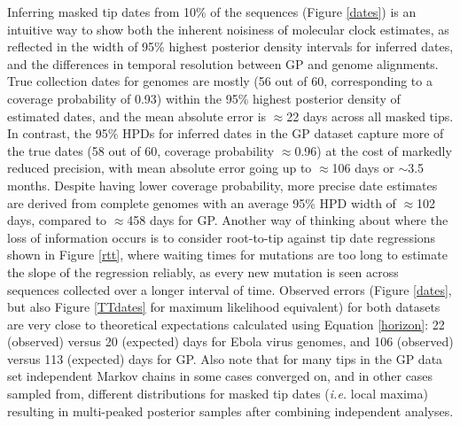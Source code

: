\documentclass[11pt,oneside,letterpaper]{article}
\begin{document}
Inferring masked tip dates from 10\% of the sequences (Figure \ref{dates}) is an intuitive way to show both the inherent noisiness of molecular clock estimates, as reflected in the width of 95\% highest posterior density intervals for inferred dates, and the differences in temporal resolution between GP and genome alignments.
True collection dates for genomes are mostly (56 out of 60, corresponding to a coverage probability of 0.93) within the 95\% highest posterior density of estimated dates, and the mean absolute error is $\approx$22 days across all masked tips.
In contrast, the 95\% HPDs for inferred dates in the GP dataset capture more of the true dates (58 out of 60, coverage probability $\approx$0.96) at the cost of markedly reduced precision, with mean absolute error going up to $\approx$106 days or $\sim$3.5 months.
Despite having lower coverage probability, more precise date estimates are derived from complete genomes with an average 95\% HPD width of $\approx$102 days, compared to $\approx$458 days for GP.
Another way of thinking about where the loss of information occurs is to consider root-to-tip against tip date regressions shown in Figure \ref{rtt}, where waiting times for mutations are too long to estimate the slope of the regression reliably, as every new mutation is seen across sequences collected over a longer interval of time.
Observed errors (Figure \ref{dates}, but also Figure \ref{TTdates} for maximum likelihood equivalent) for both datasets are very close to theoretical expectations calculated using Equation \ref{horizon}: 22 (observed) versus 20 (expected) days for Ebola virus genomes, and 106 (observed) versus 113 (expected) days for GP.
Also note that for many tips in the GP data set independent Markov chains in some cases converged on, and in other cases sampled from, different distributions for masked tip dates (\textit{i.e.} local maxima) resulting in multi-peaked posterior samples after combining independent analyses.
\end{document}

